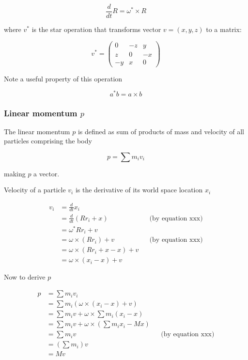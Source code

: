\documentclass[runningheads]{llncs}
\begin{document}
\begin{equation}
\frac{d}{dt}R = \omega ^* \times R
\end{equation}

where $v^*$ is the star operation that transforms vector $v=(x, y, z)$ to a matrix:

\begin{equation}
    v^* = \begin{pmatrix}
        0 & -z & y \\
        z & 0 & -x \\
        -y & x & 0
    \end{pmatrix}
\end{equation}

Note a useful property of this operation

\begin{equation}
    a^* b = a \times b
\end{equation}

\subsubsection{Linear momentum $p$} 

The linear momentum $p$ is defined as sum of products of mass and velocity of all particles comprising the body

\begin{equation}
    p = \sum m_i v_i
\end{equation}

making $p$ a vector.

Velocity of a particle $v_i$ is the derivative of its world space location $x_i$

\begin{equation}
\begin{align*} 
    v_i &= \frac{d}{dt}x_i \\
        &= \frac{d}{dt}(R r_i + x) && \text{(by equation xxx)} \\
        &= \omega^* R r_i + v \\
        &= \omega \times (R r_i) + v && \text{(by equation xxx)} \\
        &= \omega \times (R r_i + x - x) + v \\
        &= \omega \times (x_i - x) + v
\end{align*} 
\end{equation}

Now to derive $p$

\begin{equation}
\begin{align*} 
    p &= \sum m_i v_i \\
      &= \sum m_i (\omega \times (x_i - x) + v) \\
      &= \sum m_i v + \omega \times \sum m_i (x_i - x) \\
      &= \sum m_i v + \omega \times (\sum m_i x_i - M x) \\
      &= \sum m_i v && \text{(by equation xxx)} \\
      &= (\sum m_i) v \\
      &= M v
\end{align*} 
\end{equation}
\end{document}

